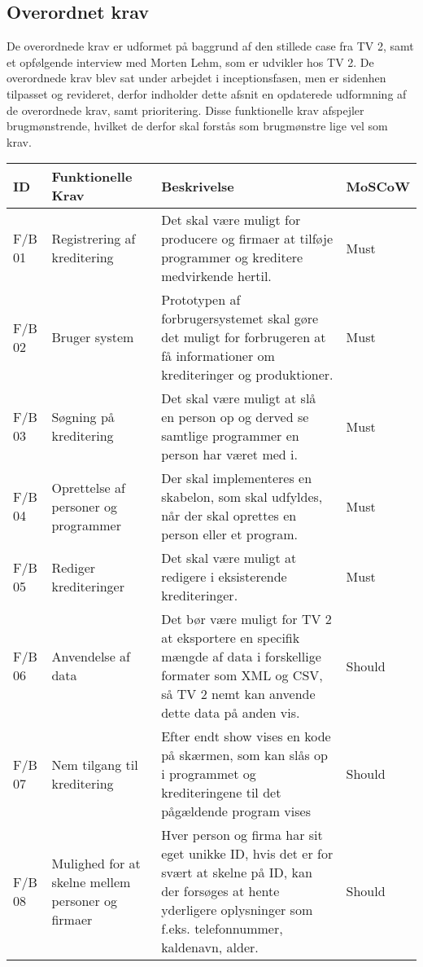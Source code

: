 \subsection{Overordnet krav}
De overordnede krav er udformet på baggrund af den stillede case fra TV 2, samt et opfølgende interview med Morten Lehm, som er udvikler hos TV 2. De overordnede krav blev sat under arbejdet i inceptionsfasen, men er sidenhen tilpasset og revideret, derfor indholder dette afsnit en opdaterede udformning af de overordnede krav, samt prioritering. Disse funktionelle krav afspejler brugmønstrende, hvilket de derfor skal forstås som brugmønstre lige vel som krav.

\begin{longtable}{|p{10mm}|p{40mm}|p{70mm}|p{20mm}|}
    \hline
    \textbf{ID} & \textbf{Funktionelle Krav} & \textbf{Beskrivelse} & \textbf{MoSCoW} \\
    \hline
    F/B 01 & Registrering af kreditering & Det skal være muligt for producere og firmaer at tilføje programmer og kreditere medvirkende hertil. & Must \\
    \hline
    F/B 02 & Bruger system & Prototypen af forbrugersystemet skal gøre det muligt for forbrugeren at få informationer om krediteringer og produktioner. & Must \\
    \hline
    F/B 03 & Søgning på kreditering & Det skal være muligt at slå en person op og derved se samtlige programmer en person har været med i. & Must \\
    \hline
    F/B 04 & Oprettelse af personer og programmer & Der skal implementeres en skabelon, som skal udfyldes, når der skal oprettes en person eller et program. & Must \\
    \hline
    F/B 05 & Rediger krediteringer & Det skal være muligt at redigere i eksisterende krediteringer. & Must \\
    \hline
    F/B 06 & Anvendelse af data & Det bør være muligt for TV 2 at eksportere en specifik  mængde af data i forskellige formater som XML og CSV, så TV 2 nemt kan anvende dette data på anden vis. & Should \\
    \hline
    F/B 07 & Nem tilgang til kreditering & Efter endt show vises en kode på skærmen, som kan slås op i programmet og krediteringene til det pågældende program vises & Should \\
    \hline
    F/B 08 & Mulighed for at skelne mellem personer og firmaer & Hver person og firma har sit eget unikke ID, hvis det er for svært at skelne på ID, kan der forsøges at hente yderligere oplysninger som f.eks. telefonnummer, kaldenavn, alder. & Should \\

\end{longtable}
